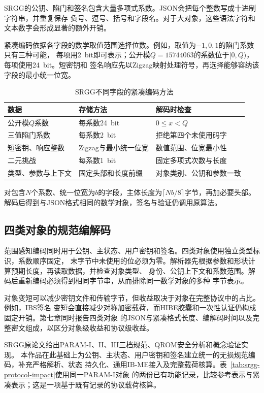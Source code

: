 SRGG的公钥、陷门和签名包含大量多项式系数。JSON会把每个整数写成十进制字符串，并重复保存
负号、逗号、括号和字段名。对于大对象，这些语法字符和文本数字会形成显著的额外开销。

紧凑编码依据各字段的数学取值范围选择位数。例如，取值为$-1,0,1$的陷门系数只有三种可能，
每项用2~bit即可表示；公开模$Q=15744063$的系数位于$[0,Q)$，每项使用24~bit。短密钥和
签名响应先以Zigzag映射处理符号，再选择能够容纳该字段的最小统一位宽。

\begin{table}[H]
\centering\small
\caption{SRGG不同字段的紧凑编码方法}
\label{tab:codec-fields}
\begin{tabularx}{\textwidth}{@{}p{}p{}X@{}}
\toprule
\rowcolor{black!8} 数据 & 存储方法 & 解码时检查 \\
\midrule
公开模$Q$系数 & 每系数24~bit & $0\leq x<Q$ \\
三值陷门系数 & 每系数2~bit & 拒绝第四个未使用码字 \\
短密钥、响应整数 & Zigzag与最小统一位宽 & 数值范围、位宽最小性 \\
二元挑战 & 每系数1~bit & 固定多项式次数与长度 \\
类型、参数与上下文 & 固定头部和长度前缀 & 对象类别、公钥和参数一致 \\
\bottomrule
\end{tabularx}
\end{table}

对包含$N$个系数、统一位宽为$b$的字段，主体长度为$\lceil Nb/8\rceil$字节，再加必要头部。
解码后得到与JSON格式相同的数学对象，签名与验证仍调用原算法。

\subsection{四类对象的规范编解码}

范围感知编码同时用于公钥、主状态、用户密钥和签名。四类对象使用独立类型标识，系数顺序固定，
末字节中未使用的位必须为零。解析器先根据参数和形状计算预期长度，再读取数据，并检查对象类型、
身份、公钥上下文和系数范围。解码后重新编码必须得到相同字节串，从而排除同一数学对象的多种
字节表示。

对象变短可以减少密钥文件和传输字节，但收益取决于对象在完整协议中的占比。例如，IBS签名
变短会直接减少对称加密载荷，而HIBE胶囊和一次性认证仍构成固定开销。第七章同时报告四类对象
的JSON与紧凑格式长度、编解码时间以及完整密文组成，以区分对象级收益和协议级收益。

SRGG原论文给出PARAM-I、II、III三档规范、QROM安全分析和概念验证实现\cite{jia2025ibs}。
本作品在此基础上为公钥、主状态、用户密钥和签名建立统一的无损规范编码，补充严格解析、状态
持久化、通用IB-ME接入及完整载荷核算。表~\ref{tab:srgg-protocol-impact}使用同一PARAM-I对象
的两份已有功能记录，比较参考表示与紧凑表示；这是一项基于既有记录的协议载荷核算。


